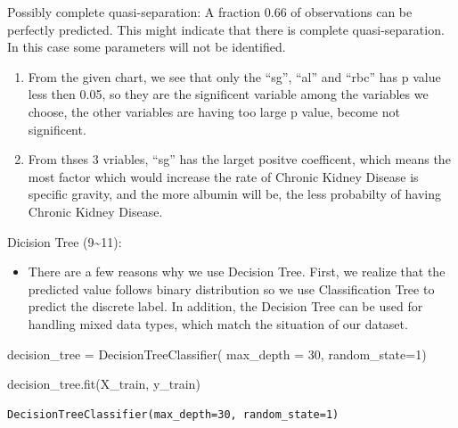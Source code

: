 \documentclass[
  11pt,
  letterpaper,
  DIV=11,
  numbers=noendperiod]{scrartcl}
\newenvironment{Shaded}{\begin{snugshade}}{\end{snugshade}}
\newcommand{\DecValTok}[1]{\textcolor[rgb]{0.68,0.00,0.00}{#1}}
\newcommand{\NormalTok}[1]{\textcolor[rgb]{0.00,0.23,0.31}{#1}}
\newcommand{\OperatorTok}[1]{\textcolor[rgb]{0.37,0.37,0.37}{#1}}
\providecommand{\tightlist}{%
  \setlength{\itemsep}{0pt}\setlength{\parskip}{0pt}}\usepackage{longtable,booktabs,array}
\begin{document}
Possibly complete quasi-separation: A fraction 0.66 of observations can be \newline
 perfectly predicted. This might indicate that there is complete \newline
 quasi-separation. In this case some parameters will not be identified.

\begin{enumerate}
\def\labelenumi{\arabic{enumi}.}
\item
  From the given chart, we see that only the ``sg'', ``al'' and ``rbc''
  has p value less then 0.05, so they are the significent variable among
  the variables we choose, the other variables are having too large p
  value, become not significent.
\item
  From thses 3 vriables, ``sg'' has the larget positve coefficent, which
  means the most factor which would increase the rate of Chronic Kidney
  Disease is specific gravity, and the more albumin will be, the less
  probabilty of having Chronic Kidney Disease.
\end{enumerate}

Dicision Tree (9\textasciitilde11):

\begin{itemize}
\tightlist
\item
  There are a few reasons why we use Decision Tree. First, we realize
  that the predicted value follows binary distribution so we use
  Classification Tree to predict the discrete label. In addition, the
  Decision Tree can be used for handling mixed data types, which match
  the situation of our dataset.
\end{itemize}

\begin{Shaded}
\begin{Highlighting}[]
\NormalTok{decision\_tree }\OperatorTok{=}\NormalTok{ DecisionTreeClassifier(}
\NormalTok{    max\_depth }\OperatorTok{=} \DecValTok{30}\NormalTok{, }
\NormalTok{    random\_state}\OperatorTok{=}\DecValTok{1}\NormalTok{)}
\end{Highlighting}
\end{Shaded}

\begin{Shaded}
\begin{Highlighting}[]
\NormalTok{decision\_tree.fit(X\_train, y\_train)}
\end{Highlighting}
\end{Shaded}

\begin{verbatim}
DecisionTreeClassifier(max_depth=30, random_state=1)
\end{verbatim}
\end{document}
